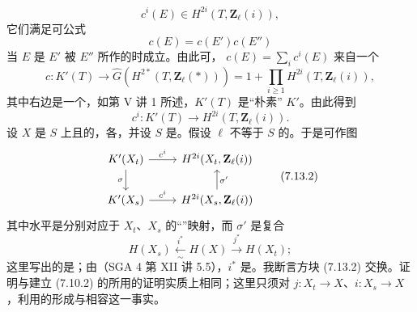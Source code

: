 \[c^i(E)\in H^{2i}(T,\mathbf Z_\ell(i)),\]
它们满足可公式
\[c(E)=c(E')c(E'')\]
当 $E$ 是 $E'$ 被 $E''$ 所作的时成立。由此可， $c(E)=\sum_i c^i(E)$ 来自一个
\[c:K'(T)\longrightarrow\widehat G(H^{2*}(T,\mathbf Z_\ell(*)))=1+\prod_{i\geq1}H^{2i}(T,\mathbf Z_\ell(i)),\tag{7.13.0}\]
其中右边是一个，如第 V 讲 1 所述，$K'(T)$ 是“朴素” $K'$。由此得到
\[c^i:K'(T)\longrightarrow H^{2i}(T,\mathbf Z_\ell(i)).\tag{7.13.1}\]
设 $X$ 是 $S$ 上且的，各，并设 $S$ 是。假设 $\ell$ 不等于 $S$ 的。于是可作图
\[\begin{tikzcd}K'(X_t)\arrow[r,"c^i"]\arrow[d,"\sigma"']&H^{2i}(X_t,\mathbf Z_\ell(i))\\K'(X_s)\arrow[r,"c^i"]&H^{2i}(X_s,\mathbf Z_\ell(i))\arrow[u,"\sigma'"']\end{tikzcd}\tag{7.13.2}\]
其中水平是分别对应于 $X_t$、$X_s$ 的“”映射，而 $\sigma'$ 是复合
\[H(X_s)\xleftarrow[\sim]{i^*}H(X)\xrightarrow{j^*}H(X_t);\]
这里写出的是；由（SGA 4 第 XII 讲 5.5），$i^*$ 是。我断言方块 (7.13.2) 交换。证明与建立 (7.10.2) 的所用的证明实质上相同；这里只须对 $j:X_t\to X$、$i:X_s\to X$，利用的形成与相容这一事实。
